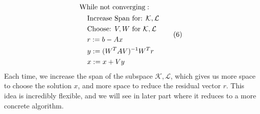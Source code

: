 \documentclass[]{article}
\theoremstyle{definition}
\begin{document}
        \begin{align}
        \begin{aligned}
            & \text{While not converging}: 
            \\&\hspace{1.1em}
                    \begin{aligned}
                    &\text{Increase Span for: } \mathcal{K, L}
                    \\
                    &\text{Choose: } V, W \text{ for } \mathcal{K}, \mathcal{L}
                    \\
                    & r := b - Ax
                    \\
                    & y := (W^TAV)^{-1}W^Tr
                    \\
                    & x := x + Vy
                \end{aligned}
        \end{aligned}\tag{6}
        \end{align}
        Each time, we increase the span of the subspace $\mathcal K, \mathcal L$, which gives us more space to choose the solution $x$, and more space to reduce the residual vector $r$. This idea is incredibly flexible, and we will see in later part where it reduces to a more concrete algorithm. 
\end{document}

